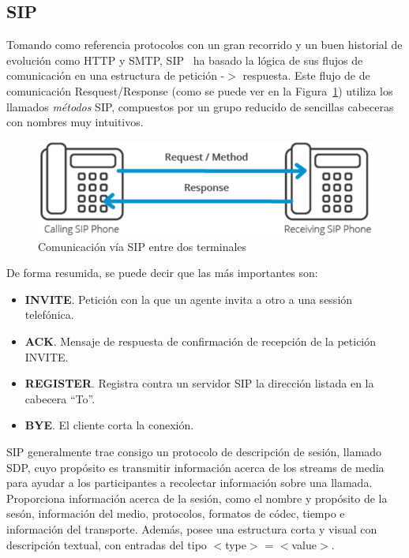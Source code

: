 \documentclass[a4paper, 12pt]{book}
\begin{document}
\subsection{SIP}
\label{sec:sip}

Tomando como referencia protocolos con un gran recorrido y un buen historial de evolución como HTTP y SMTP, SIP~\cite{johnston2009sip} ha basado la lógica de sus flujos de comunicación en una estructura de petición -$>$ respuesta. Este flujo de de comunicación Resquest/Response (como se puede ver en la Figura~\ref{figura:fig_phones}) utiliza los llamados \emph{métodos} SIP, compuestos por un grupo reducido de sencillas cabeceras con nombres muy intuitivos.

\begin{figure}[h]
  \centering
  \includegraphics{img/fig_phones}
  \caption{Comunicación vía SIP entre dos terminales}
  \label{figura:fig_phones}
\end{figure}

De forma resumida, se puede decir que las más importantes son:
\begin{itemize}
  \item \textbf{INVITE}. Petición con la que un agente invita a otro a una sessión telefónica.
  \item \textbf{ACK}. Mensaje de respuesta de confirmación de recepción de la petición INVITE.
  \item \textbf{REGISTER}. Registra contra un servidor SIP la dirección listada en la cabecera ``To''.
  \item \textbf{BYE}. El cliente corta la conexión.\\
\end{itemize}

SIP generalmente trae consigo un protocolo de descripción de sesión, llamado SDP, cuyo propósito es transmitir información acerca de los streams de media para ayudar a los participantes a recolectar información sobre una llamada. Proporciona información acerca de la sesión, como el nombre y propósito de la sesón, información del medio, protocolos, formatos de códec, tiempo e información del transporte. Además, posee una estructura corta y visual con descripción textual, con entradas del tipo $<$type$>$ = $<$value$>$.
\end{document}
